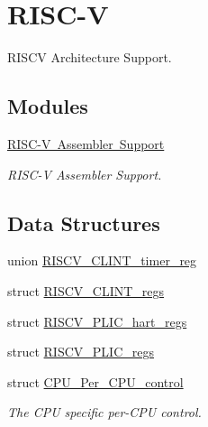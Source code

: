 \hypertarget{group__RTEMSScoreCPURISCV}{}\section{R\+I\+S\+C-\/V}
\label{group__RTEMSScoreCPURISCV}


R\+I\+S\+CV Architecture Support.  


\subsection*{Modules}
\begin{DoxyCompactItemize}
\item 
\mbox{\hyperlink{group__RTEMSScoreCPURISCVASM}{R\+I\+S\+C-\/\+V Assembler Support}}
\begin{DoxyCompactList}\small\item\em R\+I\+S\+C-\/V Assembler Support. \end{DoxyCompactList}\end{DoxyCompactItemize}
\subsection*{Data Structures}
\begin{DoxyCompactItemize}
\item 
union \mbox{\hyperlink{unionRISCV__CLINT__timer__reg}{R\+I\+S\+C\+V\+\_\+\+C\+L\+I\+N\+T\+\_\+timer\+\_\+reg}}
\item 
struct \mbox{\hyperlink{structRISCV__CLINT__regs}{R\+I\+S\+C\+V\+\_\+\+C\+L\+I\+N\+T\+\_\+regs}}
\item 
struct \mbox{\hyperlink{structRISCV__PLIC__hart__regs}{R\+I\+S\+C\+V\+\_\+\+P\+L\+I\+C\+\_\+hart\+\_\+regs}}
\item 
struct \mbox{\hyperlink{structRISCV__PLIC__regs}{R\+I\+S\+C\+V\+\_\+\+P\+L\+I\+C\+\_\+regs}}
\item 
struct \mbox{\hyperlink{structCPU__Per__CPU__control}{C\+P\+U\+\_\+\+Per\+\_\+\+C\+P\+U\+\_\+control}}
\begin{DoxyCompactList}\small\item\em The C\+PU specific per-\/\+C\+PU control. \end{DoxyCompactList}\end{DoxyCompactItemize}
